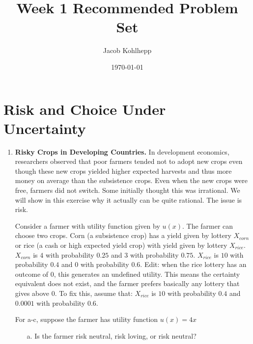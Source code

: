 \documentclass{article}
\begin{document}
\title{Week 1 Recommended Problem Set}
\author{Jacob Kohlhepp}
\date{\today}

\maketitle

\section{Risk and Choice Under Uncertainty}
\begin{enumerate}
    \item \textbf{Risky Crops in Developing Countries.} In development economics, researchers observed that poor farmers tended not to adopt new crops even though these new crops yielded higher expected harvests and thus more money on average than the subsistence crops. Even when the new crops were free, farmers did not switch. Some initially thought this was irrational. We will show in this exercise why it actually can be quite rational. The issue is risk.
    
    
    Consider a farmer with utility function given by $u(x)$. The farmer can choose two crops. Corn (a subsistence crop) has a yield given by lottery $X_{corn}$ or rice (a cash or high expected yield crop) with yield given by lottery $X_{rice}$. $X_{corn}$ is $4$ with probability $0.25$ and $3$ with probability $0.75$. $X_{rice}$ is $10$ with probability $0.4$ and $0$ with probability $0.6$. \color{blue} Edit: when the rice lottery has an outcome of 0, this generates an undefined utility. This means the certainty equivalent does not exist, and the farmer prefers basically any lottery that gives above 0.  To fix this, assume that: $X_{rice}$ is $10$ with probability $0.4$ and $0.0001$ with probability $0.6$.
    \color{black}
    
         For a-c, suppose the farmer has utility function $u(x)=4x$
     \begin{itemize}

        \item[a.]  Is the farmer risk neutral, risk loving, or risk neutral?
        

\end{itemize}
\end{enumerate}
\end{document}
